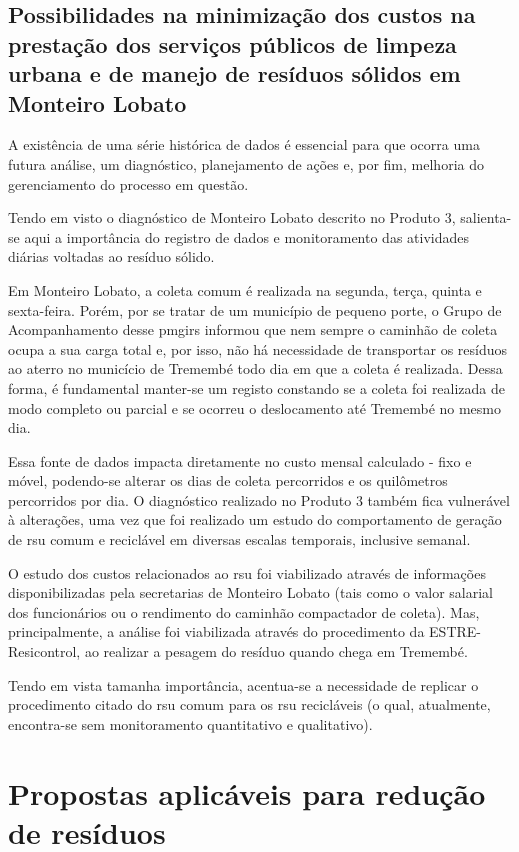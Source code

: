 \subsection{Possibilidades na minimização dos custos na prestação dos serviços públicos de limpeza urbana e de manejo de resíduos sólidos em Monteiro Lobato}

A existência de uma série histórica de dados é essencial para que ocorra uma futura análise, um diagnóstico, planejamento de ações e, por fim, melhoria do gerenciamento do processo em questão. 

Tendo em visto o diagnóstico de Monteiro Lobato descrito no Produto 3, salienta-se aqui a importância do registro de dados e monitoramento das atividades diárias voltadas ao resíduo sólido. 

Em Monteiro Lobato, a coleta comum é realizada na segunda, terça, quinta e sexta-feira. Porém, por se tratar de um município de pequeno porte, o Grupo de Acompanhamento desse \gls{pmgirs} informou que nem sempre o caminhão de coleta ocupa a sua carga total e, por isso, não há necessidade de transportar os resíduos ao aterro no municício de Tremembé todo dia em que a coleta é realizada. Dessa forma, é fundamental manter-se um registo constando se a coleta foi realizada de modo completo ou parcial e se ocorreu o deslocamento até Tremembé no mesmo dia. 

Essa fonte de dados impacta diretamente no custo mensal calculado - fixo e móvel, podendo-se alterar os dias de coleta percorridos e os quilômetros percorridos por dia. O diagnóstico realizado no Produto 3 também fica vulnerável à alterações, uma vez que foi realizado um estudo do comportamento de geração de \gls{rsu} comum e reciclável em diversas escalas temporais, inclusive semanal.

O estudo dos custos relacionados ao \gls{rsu} foi viabilizado através de informações disponibilizadas pela secretarias de Monteiro Lobato (tais como o valor salarial dos funcionários ou o rendimento do caminhão compactador de coleta). Mas, principalmente, a análise foi viabilizada através do procedimento da ESTRE-Resicontrol, ao realizar a pesagem do resíduo quando chega em Tremembé.

Tendo em vista tamanha importância, acentua-se a necessidade de replicar o procedimento citado do \gls{rsu} comum para os \gls{rsu} recicláveis (o qual, atualmente, encontra-se sem monitoramento quantitativo e qualitativo).

\newpage
\FloatBarrier
\section{Propostas aplicáveis para redução de resíduos}

